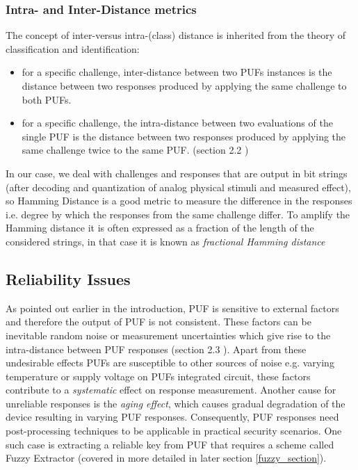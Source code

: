 \subsubsection{Intra- and Inter-Distance metrics}
\label{intra_inter_section}
The concept of inter-versus intra-(class) distance is inherited from the theory of classification and identification:
\begin{itemize}
	\item for a specific challenge, inter-distance between two PUFs instances is the distance between two responses produced by applying the same challenge to both PUFs.
	\item for a specific challenge, the intra-distance between two evaluations of the single PUF is the distance between two responses produced by applying the same challenge twice to the same PUF. (section 2.2 \cite{thbook})
\end{itemize}

In our case, we deal with challenges and responses that are output in bit strings (after decoding and quantization of analog physical stimuli and measured effect), so Hamming Distance is a good metric to measure the difference in the responses i.e. degree by which the responses from the same challenge differ. To amplify the Hamming distance it is often expressed as a fraction of the length of the considered strings, in that case it is known as \emph{fractional Hamming distance}

\subsection{Reliability Issues}
As pointed out earlier in the introduction, PUF is sensitive to external factors and therefore the output of PUF is not consistent. These factors can be inevitable random noise or measurement uncertainties which give rise to the intra-distance between PUF responses (section 2.3 \cite{thbook}). Apart from these undesirable effects PUFs are susceptible to other sources of noise e.g. varying temperature or supply voltage on PUFs integrated circuit, these factors contribute to a \emph{systematic} effect on
response measurement. Another cause for unreliable responses is the \emph{aging effect}, which causes gradual degradation of the device resulting in varying PUF responses. Consequently, PUF responses need post-processing techniques to be applicable in practical security scenarios. One such case is extracting a reliable key from PUF that requires a scheme called Fuzzy Extractor (covered in more detailed in later section \ref{fuzzy_section}).

